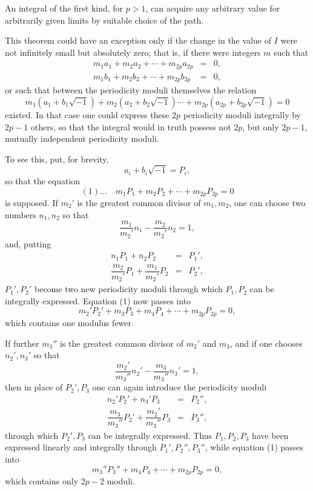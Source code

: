 \documentclass[10pt]{article}
\begin{document}
An integral of the first kind, for \(p>1\), can acquire any arbitrary value for arbitrarily given limits by suitable choice of the path.

This theorem could have an exception only if the change in the value of \(I\) were not infinitely small but absolutely zero; that is, if there were integers \(m\) such that
\[
\begin{array}{rcl}
m_1a_1+m_2a_2+\cdots+m_{2p}a_{2p}&=&0,\\
m_1b_1+m_2b_2+\cdots+m_{2p}b_{2p}&=&0,
\end{array}
\]
or such that between the periodicity moduli themselves the relation
\[
m_1(a_1+b_1\sqrt{-1})+m_2(a_2+b_2\sqrt{-1})\cdots+m_{2p}(a_{2p}+b_{2p}\sqrt{-1})=0
\]
existed. In that case one could express these \(2p\) periodicity moduli integrally by \(2p-1\) others, so that the integral would in truth possess not \(2p\), but only \(2p-1\), mutually independent periodicity moduli.

To see this, put, for brevity,
\[
a_i+b_i\sqrt{-1}=P_i,
\]
so that the equation
\[
(1)\ldots\quad m_1P_1+m_2P_2+\cdots+m_{2p}P_{2p}=0
\]
is supposed. If \(m_2'\) is the greatest common divisor of \(m_1,m_2\), one can choose two numbers \(n_1,n_2\) so that
\[
\frac{m_1}{m_2'}n_1-\frac{m_2}{m_2'}n_2=1,
\]
and, putting
\[
\begin{array}{rcl}
n_1P_1+n_2P_2&=&P_1',\\
\dfrac{m_2}{m_2'}P_1+\dfrac{m_1}{m_2'}P_2&=&P_2',
\end{array}
\]
\(P_1',P_2'\) become two new periodicity moduli through which \(P_1,P_2\) can be integrally expressed. Equation (1) now passes into
\[
m_2'P_2'+m_3P_3+m_4P_4+\cdots+m_{2p}P_{2p}=0,
\]
which contains one modulus fewer.

If further \(m_3''\) is the greatest common divisor of \(m_2'\) and \(m_3\), and if one chooses \(n_2',n_3'\) so that
\[
\frac{m_2'}{m_3''}n_2'-\frac{m_3}{m_3''}n_3'=1,
\]
then in place of \(P_2',P_3\) one can again introduce the periodicity moduli
\[
\begin{array}{rcl}
n_2'P_2'+n_3'P_3&=&P_2'',\\
\dfrac{m_3}{m_3''}P_2'+\dfrac{m_2'}{m_3''}P_3&=&P_3'',
\end{array}
\]
through which \(P_2',P_3\) can be integrally expressed. Thus \(P_1,P_2,P_3\) have been expressed linearly and integrally through \(P_1',P_2'',P_3''\), while equation (1) passes into
\[
m_3''P_3''+m_4P_4+\cdots+m_{2p}P_{2p}=0,
\]
which contains only \(2p-2\) moduli.
\end{document}
